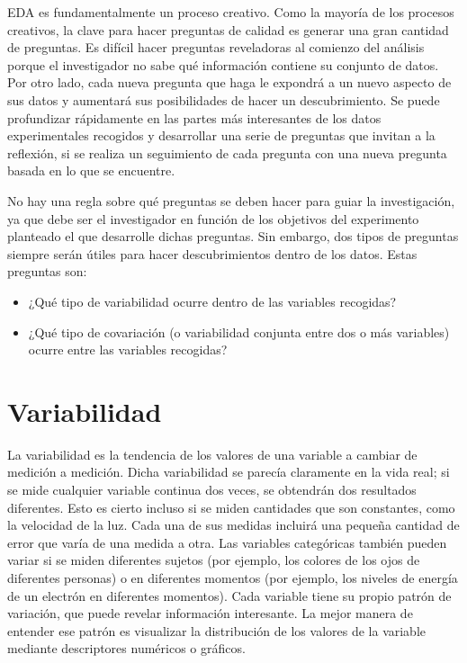 \documentclass[
]{book}
\providecommand{\tightlist}{%
  \setlength{\itemsep}{0pt}\setlength{\parskip}{0pt}}
\begin{document}
EDA es fundamentalmente un proceso creativo. Como la mayoría de los procesos creativos, la clave para hacer preguntas de calidad es generar una gran cantidad de preguntas. Es difícil hacer preguntas reveladoras al comienzo del análisis porque el investigador no sabe qué información contiene su conjunto de datos. Por otro lado, cada nueva pregunta que haga le expondrá a un nuevo aspecto de sus datos y aumentará sus posibilidades de hacer un descubrimiento. Se puede profundizar rápidamente en las partes más interesantes de los datos experimentales recogidos y desarrollar una serie de preguntas que invitan a la reflexión, si se realiza un seguimiento de cada pregunta con una nueva pregunta basada en lo que se encuentre.

No hay una regla sobre qué preguntas se deben hacer para guiar la investigación, ya que debe ser el investigador en función de los objetivos del experimento planteado el que desarrolle dichas preguntas. Sin embargo, dos tipos de preguntas siempre serán útiles para hacer descubrimientos dentro de los datos. Estas preguntas son:

\begin{itemize}
\tightlist
\item
  ¿Qué tipo de variabilidad ocurre dentro de las variables recogidas?
\item
  ¿Qué tipo de covariación (o variabilidad conjunta entre dos o más variables) ocurre entre las variables recogidas?
\end{itemize}

\hypertarget{variabilidad}{%
\section{Variabilidad}\label{variabilidad}}

La variabilidad es la tendencia de los valores de una variable a cambiar de medición a medición. Dicha variabilidad se parecía claramente en la vida real; si se mide cualquier variable continua dos veces, se obtendrán dos resultados diferentes. Esto es cierto incluso si se miden cantidades que son constantes, como la velocidad de la luz. Cada una de sus medidas incluirá una pequeña cantidad de error que varía de una medida a otra. Las variables categóricas también pueden variar si se miden diferentes sujetos (por ejemplo, los colores de los ojos de diferentes personas) o en diferentes momentos (por ejemplo, los niveles de energía de un electrón en diferentes momentos). Cada variable tiene su propio patrón de variación, que puede revelar información interesante. La mejor manera de entender ese patrón es visualizar la distribución de los valores de la variable mediante descriptores numéricos o gráficos.
\end{document}
